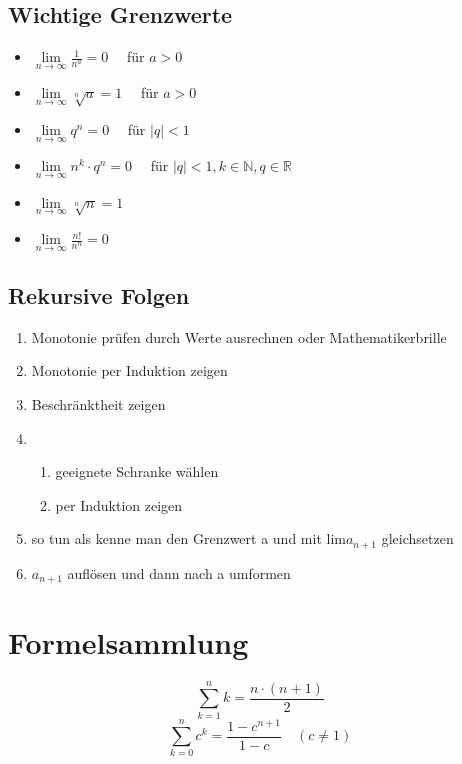 \documentclass[12pt,a4paper]{article}
\begin{document}
\subsection{Wichtige Grenzwerte}
\begin{itemize}
	\item $\lim\limits_{n\rightarrow \infty} \frac{1}{n^a}=0\quad$ für $a>0$
	\item $\lim\limits_{n\rightarrow \infty} \sqrt[n]{a}=1\quad$ für $a>0$
	\item $\lim\limits_{n\rightarrow \infty} q^n=0\quad$ für $|q|<1$
	\item $\lim\limits_{n\rightarrow \infty} n^k\cdot q^n=0\quad$ für $|q|<1, k\in\mathbb{N}, q\in\mathbb{R}$
	\item $\lim\limits_{n\rightarrow \infty} \sqrt[n]{n}=1$
	\item $\lim\limits_{n\rightarrow \infty} \frac{n!}{n^n}=0$
\end{itemize}


\subsection{Rekursive Folgen}
\begin{enumerate}
	\item Monotonie prüfen durch Werte ausrechnen oder Mathematikerbrille
	\item Monotonie per Induktion zeigen
	\item Beschränktheit zeigen 
	\item \begin{enumerate}
		\item geeignete Schranke wählen
		\item per Induktion zeigen
	\end{enumerate}
	\item so tun als kenne man den Grenzwert a und mit lim$a_{n+1}$ gleichsetzen
	\item $a_{n+1}$ auflösen und dann nach a umformen
\end{enumerate}

\pagebreak
\section{Formelsammlung}
\[\sum_{k=1}^nk=\frac{n\cdot(n+1)}{2}\]
\[\sum_{k=0}^nc^k=\frac{1-c^{n+1}}{1-c}\quad(c\neq 1)\]
\end{document}
